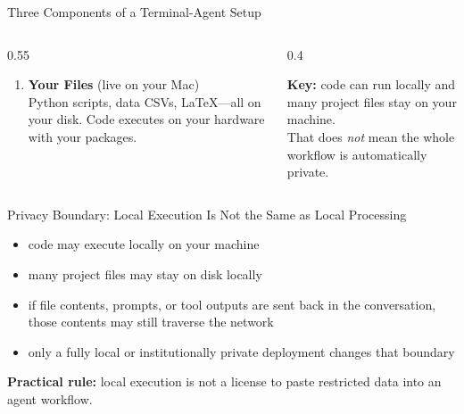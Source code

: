 \documentclass[10pt,english,aspectratio=169]{beamer}
\begin{document}
\begin{frame}{Three Components of a Terminal-Agent Setup}
\begin{columns}[T]
\begin{column}{0.55\textwidth}
\begin{enumerate}
    \item \textbf{Your Files} (live on your Mac)\\
    \small Python scripts, data CSVs, LaTeX---all on your disk. Code executes on your hardware with your packages.
\end{enumerate}
\end{column}
\begin{column}{0.4\textwidth}
\begin{center}
\end{center}
\vspace{0.3cm}
\footnotesize
\textbf{Key:} code can run locally and many project files stay on your machine.\\
That does \textit{not} mean the whole workflow is automatically private.
\end{column}
\end{columns}
\end{frame}

\begin{frame}{Privacy Boundary: Local Execution Is Not the Same as Local Processing}
\begin{itemize}
    \item code may execute locally on your machine
    \item many project files may stay on disk locally
    \item if file contents, prompts, or tool outputs are sent back in the conversation, those contents may still traverse the network
    \item only a fully local or institutionally private deployment changes that boundary
\end{itemize}

\vspace{0.25cm}
\textbf{Practical rule:} local execution is not a license to paste restricted data into an agent workflow.
\end{frame}
\end{document}
